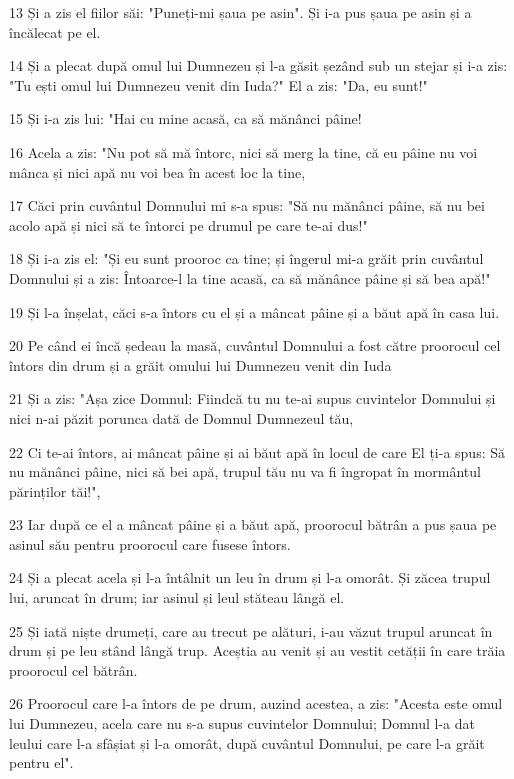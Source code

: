 \par 13 Și a zis el fiilor săi: "Puneți-mi șaua pe asin". Și i-a pus șaua pe asin și a încălecat pe el.
\par 14 Și a plecat după omul lui Dumnezeu și l-a găsit șezând sub un stejar și i-a zis: "Tu ești omul lui Dumnezeu venit din Iuda?" El a zis: "Da, eu sunt!"
\par 15 Și i-a zis lui: "Hai cu mine acasă, ca să mănânci pâine!
\par 16 Acela a zis: "Nu pot să mă întorc, nici să merg la tine, că eu pâine nu voi mânca și nici apă nu voi bea în acest loc la tine,
\par 17 Căci prin cuvântul Domnului mi s-a spus: "Să nu mănânci pâine, să nu bei acolo apă și nici să te întorci pe drumul pe care te-ai dus!"
\par 18 Și i-a zis el: "Și eu sunt prooroc ca tine; și îngerul mi-a grăit prin cuvântul Domnului și a zis: Întoarce-l la tine acasă, ca să mănânce pâine și să bea apă!"
\par 19 Și l-a înșelat, căci s-a întors cu el și a mâncat pâine și a băut apă în casa lui.
\par 20 Pe când ei încă ședeau la masă, cuvântul Domnului a fost către proorocul cel întors din drum și a grăit omului lui Dumnezeu venit din Iuda
\par 21 Și a zis: "Așa zice Domnul: Fiindcă tu nu te-ai supus cuvintelor Domnului și nici n-ai păzit porunca dată de Domnul Dumnezeul tău,
\par 22 Ci te-ai întors, ai mâncat pâine și ai băut apă în locul de care El ți-a spus: Să nu mănânci pâine, nici să bei apă, trupul tău nu va fi îngropat în mormântul părinților tăi!",
\par 23 Iar după ce el a mâncat pâine și a băut apă, proorocul bătrân a pus șaua pe asinul său pentru proorocul care fusese întors.
\par 24 Și a plecat acela și l-a întâlnit un leu în drum și l-a omorât. Și zăcea trupul lui, aruncat în drum; iar asinul și leul stăteau lângă el.
\par 25 Și iată niște drumeți, care au trecut pe alături, i-au văzut trupul aruncat în drum și pe leu stând lângă trup. Aceștia au venit și au vestit cetății în care trăia proorocul cel bătrân.
\par 26 Proorocul care l-a întors de pe drum, auzind acestea, a zis: "Acesta este omul lui Dumnezeu, acela care nu s-a supus cuvintelor Domnului; Domnul l-a dat leului care l-a sfâșiat și l-a omorât, după cuvântul Domnului, pe care l-a grăit pentru el".
